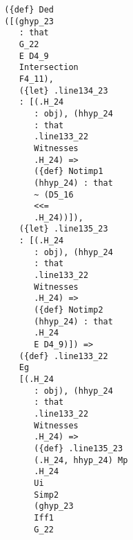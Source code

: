 \documentclass[12pt]{article}
\begin{document}
\begin{verbatim}
                                        ({def} Ded 
                                        ([(ghyp_23 
                                           : that 
                                           G_22 
                                           E D4_9 
                                           Intersection 
                                           F4_11), 
                                           ({let} .line134_23 
                                           : [(.H_24 
                                              : obj), (hhyp_24 
                                              : that 
                                              .line133_22 
                                              Witnesses 
                                              .H_24) => 
                                              ({def} Notimp1 
                                              (hhyp_24) : that 
                                              ~ (D5_16 
                                              <<= 
                                              .H_24))]), 
                                           ({let} .line135_23 
                                           : [(.H_24 
                                              : obj), (hhyp_24 
                                              : that 
                                              .line133_22 
                                              Witnesses 
                                              .H_24) => 
                                              ({def} Notimp2 
                                              (hhyp_24) : that 
                                              .H_24 
                                              E D4_9)]) => 
                                           ({def} .line133_22 
                                           Eg 
                                           [(.H_24 
                                              : obj), (hhyp_24 
                                              : that 
                                              .line133_22 
                                              Witnesses 
                                              .H_24) => 
                                              ({def} .line135_23 
                                              (.H_24, hhyp_24) Mp 
                                              .H_24 
                                              Ui 
                                              Simp2 
                                              (ghyp_23 
                                              Iff1 
                                              G_22 

\end{verbatim}
\end{document}
